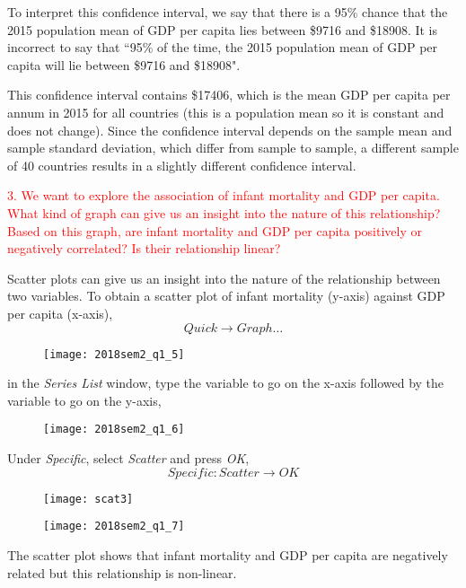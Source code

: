 \documentclass[12pt]{report}
\begin{document}
\noindent To interpret this confidence interval, we say that there is a 95\% chance that the 2015 population mean of GDP per capita lies between \$9716 and \$18908. It is incorrect to say that ``95\% of the time, the 2015 population mean of GDP per capita will lie between \$9716 and \$18908".

\noindent This confidence interval contains \$17406, which is the mean GDP per capita per annum in 2015 for all countries (this is a population mean so it is constant and does not change). Since the confidence interval depends on the sample mean and sample standard deviation, which differ from sample to sample, a different sample of 40 countries results in a slightly different confidence interval. 


\newpage
\noindent \textcolor{red}{3. We want to explore the association of infant mortality and GDP per capita. What kind of graph can give us an insight into the nature of this relationship? Based on this graph, are infant mortality and GDP per capita positively or negatively correlated? Is their relationship linear?}

\noindent Scatter plots can give us an insight into the nature of the relationship between two variables. To obtain a scatter plot of infant mortality (y-axis) against GDP per capita (x-axis),
$$Quick \to Graph \dots$$
\begin{figure}[H]
	\centerline{\texttt{[image: 2018sem2\_q1\_5]}}
\end{figure}
\vspace{-\baselineskip} \noindent in the \textit{Series List} window, type the variable to go on the x-axis followed by the variable to go on the y-axis,
\begin{figure}[H]
	\centerline{\texttt{[image: 2018sem2\_q1\_6]}}
\end{figure}
\vspace{-\baselineskip} \noindent Under \textit{Specific}, select \textit{Scatter} and press \textit{OK},
$$Specific:Scatter \to OK$$
\begin{figure}[H]
	\centerline{\texttt{[image: scat3]}}
\end{figure}
\vspace{-\baselineskip}	
\begin{figure}[H]
	\centerline{\texttt{[image: 2018sem2\_q1\_7]}}
\end{figure}
\vspace{-\baselineskip}	\noindent The scatter plot shows that infant mortality and GDP per capita are negatively related but this relationship is non-linear.
\end{document}
